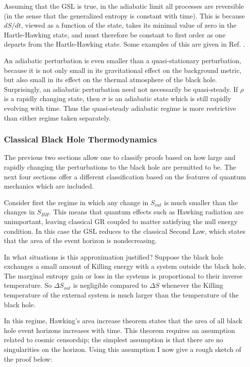 \documentclass[12pt]{article}
\begin{document}
Assuming that the GSL is true, in the adiabatic limit all processes are reversible (in the sense that the generalized entropy is constant with time).  This is because $dS/dt$, viewed as a function of the state, takes its minimal value of zero in the Hartle-Hawking state, and must therefore be constant to first order as one departs from the Hartle-Hawking state.  Some examples of this are given in Ref. \cite{bek98}.

An adiabatic perturbation is even smaller than a quasi-stationary perturbation, because it is not only small in its gravitational effect on the background metric, but also small in its effect on the thermal atmosphere of the black hole.  Surprisingly, an adiabatic perturbation need not necessarily be quasi-steady.  If $\rho$ is a rapidly changing state, then $\sigma$
is an adiabatic state which is still rapidly evolving with time.  Thus the quasi-steady adiabatic regime is more restrictive than either regime taken separately.

\subsubsection{Classical Black Hole Thermodynamics}\label{class}

The previous two sections allow one to classify proofs based on how large and rapidly changing the perturbations to the black hole are permitted to be.  The next four sections offer a different classification based on the features of quantum mechanics which are included.

Consider first the regime in which any change in $S_{out}$ is much smaller than the changes in $S_{BH}$.  This means that quantum effects such as Hawking radiation are unimportant, leaving classical GR coupled to matter satisfying the null energy condition.  In this case the GSL reduces to the classical Second Law, which states that the area of the event horizon is nondecreasing.

In what situations is this approximation justified?  Suppose the black hole exchanges a small amount of Killing energy with a system outside the black hole.  The marginal entropy gain or loss in the systems is proportional to their inverse temperature.  So $\Delta S_{out}$ is negligible compared to $\Delta S$ whenever the Killing temperature of the external system is much larger than the temperature of the black hole.

In this regime, Hawking's area increase theorem \cite{hawking71} states that the area of all black hole event horizons increases with time.  This theorem requires an assumption related to cosmic censorship; the simplest assumption is that there are no singularities on the horizon.  Using this assumption I now give a rough sketch of the proof below:
\end{document}
